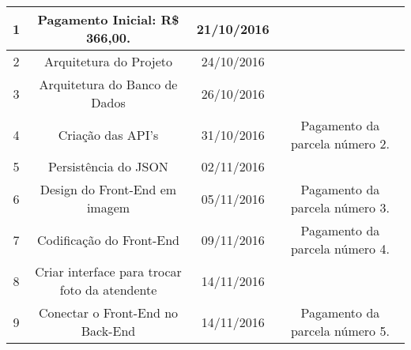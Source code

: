 
\begin{center}
 \label{tab:title} 
\begin{tabular}{ |c|c|c|c| } 
\hline
1 & Pagamento Inicial: R\$ 366,00. & 21/10/2016 &  \\ \hline
2 & Arquitetura do Projeto & 24/10/2016 &  \\ \hline
3 & Arquitetura do Banco de Dados & 26/10/2016 &  \\ \hline
4 & Criação das API's & 31/10/2016 & Pagamento da parcela número 2. \\ \hline
5 & Persistência do JSON & 02/11/2016 &  \\ \hline
6 & Design do Front-End em imagem & 05/11/2016 & Pagamento da parcela número 3. \\ \hline
7 & Codificação do Front-End & 09/11/2016 & Pagamento da parcela número 4. \\ \hline
8 & Criar interface para trocar foto da atendente & 14/11/2016 &  \\ \hline
9 & Conectar o Front-End no Back-End & 14/11/2016 & Pagamento da parcela número 5. \\ \hline
\end{tabular}
\end{center}
